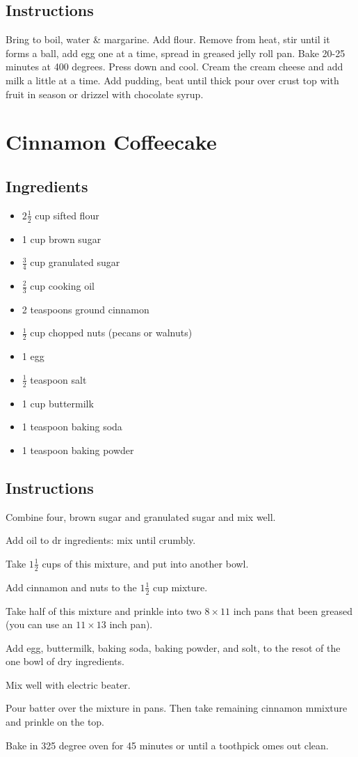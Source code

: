 \documentclass{book}
\begin{document}
\subsection*{Instructions}
Bring to boil, water & margarine. Add flour. Remove from heat, stir until it forms a ball, add egg one at a time, spread in greased jelly roll pan. Bake 20-25 minutes at 400 degrees. Press down and cool. Cream the cream cheese and add milk a little at a time. Add pudding, beat until thick pour over crust top with fruit in season or drizzel with chocolate syrup.
\newpage
{}
\section*{Cinnamon Coffeecake}
\subsection*{Ingredients}
\begin{itemize}
\item
$2\frac{1}{2}$ cup sifted flour
\item
1 cup brown sugar
\item
$\frac{3}{4}$ cup granulated sugar
\item
$\frac{2}{3}$ cup cooking oil
\item
2 teaspoons ground cinnamon
\item
$\frac{1}{2}$ cup chopped nuts (pecans or walnuts)
\item
1 egg
\item
$\frac{1}{2}$ teaspoon salt
\item
1 cup buttermilk
\item
1 teaspoon baking soda
\item
1 teaspoon baking powder
\end{itemize}
\subsection*{Instructions}
\begin{numerize}
\item
Combine four, brown sugar and granulated sugar and mix well.
\item
Add oil to dr ingredients: mix until crumbly. 
\item
Take $1\frac{1}{2}$ cups of this mixture, and put into another bowl.
\item
Add cinnamon and nuts to the $1\frac{1}{2}$ cup mixture.
\item
Take half of this mixture and prinkle into two $8\times11$ inch pans that been greased (you can use an $11\times13$ inch pan).
\item
Add egg, buttermilk, baking soda, baking powder, and solt, to the resot of the one bowl of dry ingredients.
\item
Mix well with electric beater.
\item
Pour batter over the mixture in pans. Then take remaining cinnamon mmixture and prinkle on the top.
\item
Bake in 325 degree oven for 45 minutes or until a toothpick omes out clean.
\end{numerize}
\newpage
{}
\end{document}
